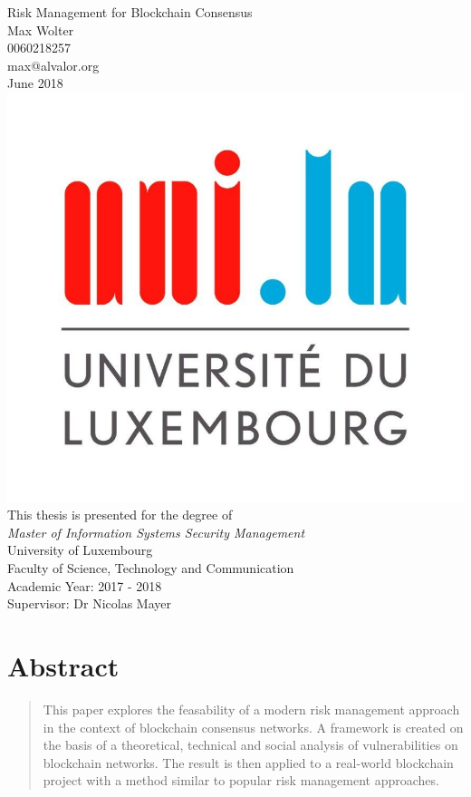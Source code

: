 \documentclass[12pt,a4paper]{article}
\begin{document}
\begin{center}
  Risk Management for Blockchain Consensus\\
  Max Wolter\\
  0060218257\\
  max@alvalor.org\\
  June 2018\\
  \includegraphics[scale=0.4]{logo_uni.jpg}\\
  This thesis is presented for the degree of\\
  \textit{Master of Information Systems Security Management}\\
  University of Luxembourg\\
  Faculty of Science, Technology and Communication\\
  Academic Year: 2017 - 2018\\
  Supervisor: Dr Nicolas Mayer\\
\end{center}

\newpage

\vspace{4cm}

\section*{Abstract}

\begin{abstract}
  This paper explores the feasability of a modern risk management approach in the context of blockchain consensus networks. A framework is created on the basis of a theoretical, technical and social analysis of vulnerabilities on blockchain networks. The result is then applied to a real-world blockchain project with a method similar to popular risk management approaches.
\end{abstract}
\end{document}
